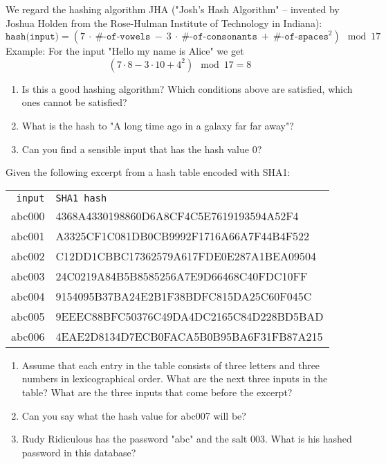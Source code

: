 \documentclass[11pt,a4paper]{report}
\begin{document}
\begin{ex}
We regard the hashing algorithm JHA ("Josh's Hash Algorithm" -- invented by Joshua Holden from the Rose-Hulman Institute of Technology in Indiana): 
\[
\texttt{hash(input)} = (7\ \cdot\ \texttt{\#-of-vowels}\  -\  3\ \cdot \ \texttt{\#-of-consonants}\  +\  \texttt{\#-of-spaces}^2) \mod 17
\]
Example: For the input "Hello my name is Alice" we get
\[
(7\cdot 8 - 3\cdot 10 + 4^2) \mod 17 = 8
\] 
\begin{enumerate}
\item Is this a good hashing algorithm? Which conditions above are satisfied, which ones cannot be satisfied?
\item What is the hash to "A long time ago in a galaxy far far away"?
\item Can you find a sensible input that has the hash value $0$?
\end{enumerate}
\end{ex}


\newpage

\begin{ex}
Given the following excerpt from a hash table encoded with  SHA1:

\begin{tabular}{rl}
\texttt{input} & \texttt{SHA1 hash} \\
abc000 & 4368A4330198860D6A8CF4C5E7619193594A52F4 \\
abc001 & A3325CF1C081DB0CB9992F1716A66A7F44B4F522 \\
abc002 & C12DD1CBBC17362579A617FDE0E287A1BEA09504 \\
abc003 & 24C0219A84B5B8585256A7E9D66468C40FDC10FF \\ 
abc004 & 9154095B37BA24E2B1F38BDFC815DA25C60F045C \\
abc005 & 9EEEC88BFC50376C49DA4DC2165C84D228BD5BAD \\
abc006 & 4EAE2D8134D7ECB0FACA5B0B95BA6F31FB87A215 
\end{tabular}

\begin{enumerate}
\item Assume that each entry in the table consists of three letters and three numbers in lexicographical order. What are the next three inputs in the table? What are the three inputs that come before the excerpt?
\item Can you say what the hash value for abc007 will be?
\item Rudy Ridiculous has the password "abc" and the salt $003$. What is his hashed password in this database?
\end{enumerate}
\end{ex}
\end{document}
